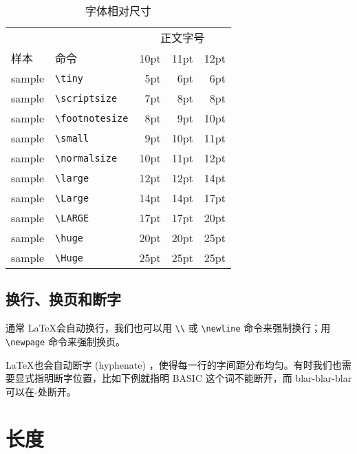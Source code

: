 \begin{table}[htbp]
\centering
\caption{字体相对尺寸}
\label{tab:fontsize}
\begin{tabular}{llrrr}
  \toprule
  & & \multicolumn{3}{c}{正文字号} \\
  \cmidrule(lr){3-5}
  样本 & 命令 & 10pt & 11pt & 12pt \\
  \midrule
  \tiny{sample} & \verb|\tiny|         & 5pt  & 6pt  & 6pt \\
  \scriptsize{sample} & \verb|\scriptsize|   & 7pt  & 8pt  & 8pt \\
  \footnotesize{sample} & \verb|\footnotesize| & 8pt  & 9pt  & 10pt \\
  \small{sample} & \verb|\small|        & 9pt  & 10pt & 11pt \\
  \normalsize{sample} & \verb|\normalsize|   & 10pt & 11pt & 12pt \\
  \large{sample} & \verb|\large|        & 12pt & 12pt & 14pt \\
  \Large{sample} & \verb|\Large|        & 14pt & 14pt & 17pt \\
  \LARGE{sample} & \verb|\LARGE|        & 17pt & 17pt & 20pt \\
  \huge{sample} & \verb|\huge|         & 20pt & 20pt & 25pt \\
  \Huge{sample} & \verb|\Huge|         & 25pt & 25pt & 25pt \\
  \bottomrule
\end{tabular}
\end{table}

\subsection{换行、换页和断字}

通常 \LaTeX 会自动换行，我们也可以用 \verb|\\| 或 \verb|\newline| 命令来强制换行；用 \verb|\newpage| 命令来强制换页。

\LaTeX 也会自动断字 (hyphenate) ，使得每一行的字间距分布均匀。有时我们也需要显式指明断字位置，比如下例就指明 BASIC 这个词不能断开，而 blar-blar-blar 可以在-处断开。

\begin{Code}[]
\end{Code}

\section{长度}
\label{sec:length}

